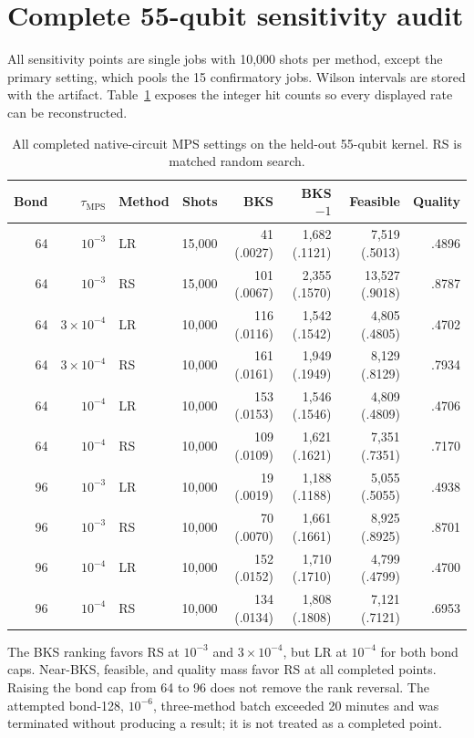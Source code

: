 \documentclass[10pt]{article}
\newcommand{\tauMPS}{\tau_{\mathrm{MPS}}}
\begin{document}
\section{Complete 55-qubit sensitivity audit}

All sensitivity points are single jobs with 10,000 shots per method, except
the primary setting, which pools the 15 confirmatory jobs. Wilson intervals are
stored with the artifact. Table~\ref{tab:sensitivity} exposes the integer hit
counts so every displayed rate can be reconstructed.

\begin{table}[h]
\centering
\caption{All completed native-circuit MPS settings on the held-out 55-qubit
kernel. RS is matched random search.}
\label{tab:sensitivity}
\begin{tabular}{rrlrrrrr}
\toprule
Bond & $\tauMPS$ & Method & Shots & BKS & BKS$-1$ & Feasible & Quality \\
\midrule
64 & $10^{-3}$ & LR & 15,000 & 41 (.0027) & 1,682 (.1121) & 7,519 (.5013) & .4896 \\
64 & $10^{-3}$ & RS & 15,000 & 101 (.0067) & 2,355 (.1570) & 13,527 (.9018) & .8787 \\
64 & $3\times10^{-4}$ & LR & 10,000 & 116 (.0116) & 1,542 (.1542) & 4,805 (.4805) & .4702 \\
64 & $3\times10^{-4}$ & RS & 10,000 & 161 (.0161) & 1,949 (.1949) & 8,129 (.8129) & .7934 \\
64 & $10^{-4}$ & LR & 10,000 & 153 (.0153) & 1,546 (.1546) & 4,809 (.4809) & .4706 \\
64 & $10^{-4}$ & RS & 10,000 & 109 (.0109) & 1,621 (.1621) & 7,351 (.7351) & .7170 \\
96 & $10^{-3}$ & LR & 10,000 & 19 (.0019) & 1,188 (.1188) & 5,055 (.5055) & .4938 \\
96 & $10^{-3}$ & RS & 10,000 & 70 (.0070) & 1,661 (.1661) & 8,925 (.8925) & .8701 \\
96 & $10^{-4}$ & LR & 10,000 & 152 (.0152) & 1,710 (.1710) & 4,799 (.4799) & .4700 \\
96 & $10^{-4}$ & RS & 10,000 & 134 (.0134) & 1,808 (.1808) & 7,121 (.7121) & .6953 \\
\bottomrule
\end{tabular}
\end{table}

The BKS ranking favors RS at $10^{-3}$ and $3\times10^{-4}$, but LR at
$10^{-4}$ for both bond caps. Near-BKS, feasible, and quality mass favor RS at
all completed points. Raising the bond cap from 64 to 96 does not remove the
rank reversal. The attempted bond-128, $10^{-6}$, three-method batch exceeded
20 minutes and was terminated without producing a result; it is not treated as
a completed point.
\end{document}
